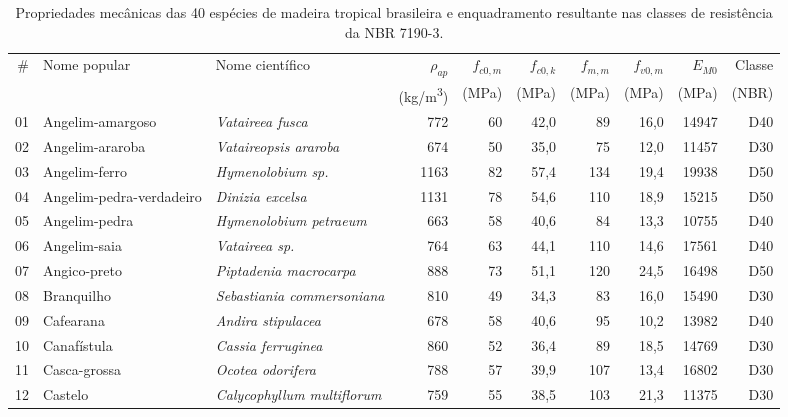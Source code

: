 \begin{table}[!ht]
\caption{Propriedades mecânicas das 40 espécies de madeira tropical brasileira e enquadramento resultante nas classes de resistência da NBR 7190-3.\label{tab:especies}}
\begin{threeparttable}
\footnotesize
\setlength{\tabcolsep}{3pt}
\begin{tabular*}{\textwidth}{@{\extracolsep{\fill}}rllrrrrrrr@{\extracolsep{\fill}}}
\toprule
\# & Nome popular & Nome científico & $\rho_{ap}$ & $f_{c0,m}$ & $f_{c0,k}$ & $f_{m,m}$ & $f_{v0,m}$ & $E_{M0}$ & Classe \\
 & & & (kg/m\textsuperscript{3}) & (MPa) & (MPa) & (MPa) & (MPa) & (MPa) & (NBR) \\
\midrule
01 & Angelim-amargoso & \textit{Vataireea fusca} & 772 & 60 & 42,0 & 89 & 16,0 & 14947 & D40 \\
02 & Angelim-araroba & \textit{Vataireopsis araroba} & 674 & 50 & 35,0 & 75 & 12,0 & 11457 & D30 \\
03 & Angelim-ferro & \textit{Hymenolobium sp.} & 1163 & 82 & 57,4 & 134 & 19,4 & 19938 & D50 \\
04 & Angelim-pedra-verdadeiro & \textit{Dinizia excelsa} & 1131 & 78 & 54,6 & 110 & 18,9 & 15215 & D50 \\
05 & Angelim-pedra & \textit{Hymenolobium petraeum} & 663 & 58 & 40,6 & 84 & 13,3 & 10755 & D40 \\
06 & Angelim-saia & \textit{Vataireea sp.} & 764 & 63 & 44,1 & 110 & 14,6 & 17561 & D40 \\
07 & Angico-preto & \textit{Piptadenia macrocarpa} & 888 & 73 & 51,1 & 120 & 24,5 & 16498 & D50 \\
08 & Branquilho & \textit{Sebastiania commersoniana} & 810 & 49 & 34,3 & 83 & 16,0 & 15490 & D30 \\
09 & Cafearana & \textit{Andira stipulacea} & 678 & 58 & 40,6 & 95 & 10,2 & 13982 & D40 \\
10 & Canafístula & \textit{Cassia ferruginea} & 860 & 52 & 36,4 & 89 & 18,5 & 14769 & D30 \\
11 & Casca-grossa & \textit{Ocotea odorifera} & 788 & 57 & 39,9 & 107 & 13,4 & 16802 & D30 \\
12 & Castelo & \textit{Calycophyllum multiflorum} & 759 & 55 & 38,5 & 103 & 21,3 & 11375 & D30 \\

\end{tabular*}
\end{threeparttable}
\end{table}
